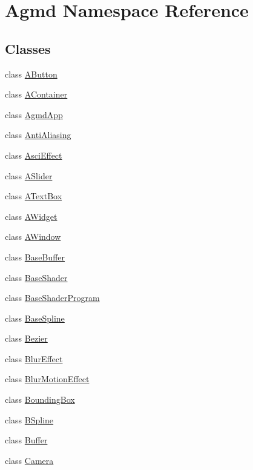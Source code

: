 \hypertarget{namespace_agmd}{\section{Agmd Namespace Reference}
\label{namespace_agmd}
}
\subsection*{Classes}
\begin{DoxyCompactItemize}
\item 
class \hyperlink{class_agmd_1_1_a_button}{A\+Button}
\item 
class \hyperlink{class_agmd_1_1_a_container}{A\+Container}
\item 
class \hyperlink{class_agmd_1_1_agmd_app}{Agmd\+App}
\item 
class \hyperlink{class_agmd_1_1_anti_aliasing}{Anti\+Aliasing}
\item 
class \hyperlink{class_agmd_1_1_asci_effect}{Asci\+Effect}
\item 
class \hyperlink{class_agmd_1_1_a_slider}{A\+Slider}
\item 
class \hyperlink{class_agmd_1_1_a_text_box}{A\+Text\+Box}
\item 
class \hyperlink{class_agmd_1_1_a_widget}{A\+Widget}
\item 
class \hyperlink{class_agmd_1_1_a_window}{A\+Window}
\item 
class \hyperlink{class_agmd_1_1_base_buffer}{Base\+Buffer}
\item 
class \hyperlink{class_agmd_1_1_base_shader}{Base\+Shader}
\item 
class \hyperlink{class_agmd_1_1_base_shader_program}{Base\+Shader\+Program}
\item 
class \hyperlink{class_agmd_1_1_base_spline}{Base\+Spline}
\item 
class \hyperlink{class_agmd_1_1_bezier}{Bezier}
\item 
class \hyperlink{class_agmd_1_1_blur_effect}{Blur\+Effect}
\item 
class \hyperlink{class_agmd_1_1_blur_motion_effect}{Blur\+Motion\+Effect}
\item 
class \hyperlink{class_agmd_1_1_bounding_box}{Bounding\+Box}
\item 
class \hyperlink{class_agmd_1_1_b_spline}{B\+Spline}
\item 
class \hyperlink{class_agmd_1_1_buffer}{Buffer}
\item 
class \hyperlink{class_agmd_1_1_camera}{Camera}

\end{DoxyCompactItemize}
